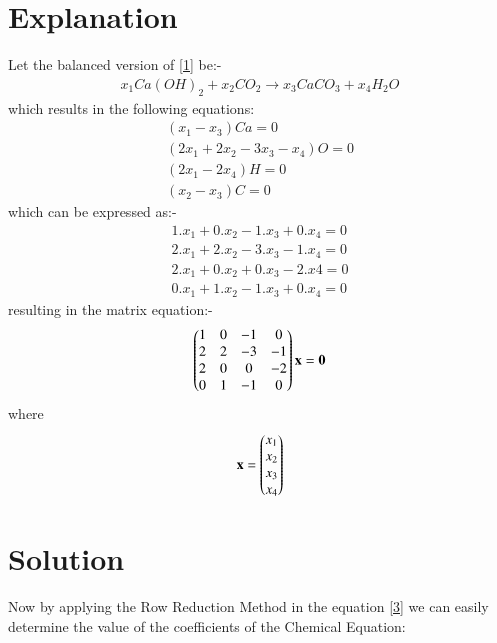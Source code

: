 \documentclass[journal,12pt,twocolumn]{IEEEtran}
\begin{document}
\section{Explanation}
Let the balanced version of \eqref{1} be:-
\begin{align}\label{2}
x_1Ca(OH)_2 + x_2CO_2 \xrightarrow{} x_3CaCO_3 + x_4H_2O
\end{align}
which results in the following equations:
\begin{equation}
 \begin{aligned}
    (x_1-x_3)Ca=0\\
    (2x_1+2x_2-3x_3-x_4)O=0\\
    (2x_1-2x_4)H=0\\
    (x_2-x_3)C=0
 \end{aligned}
\end{equation}
which can be expressed as:-
\begin{equation}
 \begin{aligned}
    1.x_1 + 0.x_2 - 1.x_3 + 0.x_4=0\\
    2.x_1 + 2.x_2 - 3.x_3 - 1.x_4=0\\
    2.x_1 + 0.x_2 + 0.x_3 - 2.x4=0\\
    0.x_1 + 1.x_2 - 1.x_3 + 0.x_4=0
 \end{aligned}
\end{equation}
resulting in the matrix equation:-
\begin{align}\label{3}
    \begin{pmatrix}1 & 0 & -1 & 0\\
    2 & 2 & -3 & -1\\
    2 & 0 & 0 & -2\\
    0 & 1 & -1 & 0\end{pmatrix}\mathbf{x}=\mathbf{0}
\end{align}
where
\begin{align}
    \mathbf{x}=\begin{pmatrix}x_1\\x_2\\x_3\\x_4\end{pmatrix}
\end{align}
\section{Solution}
Now by applying the Row Reduction Method in the equation \eqref{3} we can easily determine the value of the coefficients of the Chemical Equation:
\end{document}
